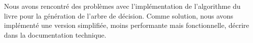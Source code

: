 Nous avons rencontré des problèmes avec l'implémentation de l'algorithme du livre pour la génération de l'arbre de décision. Comme solution, nous avons implémenté une version simplifiée, moins performante mais fonctionnelle, décrire dans la documentation technique.